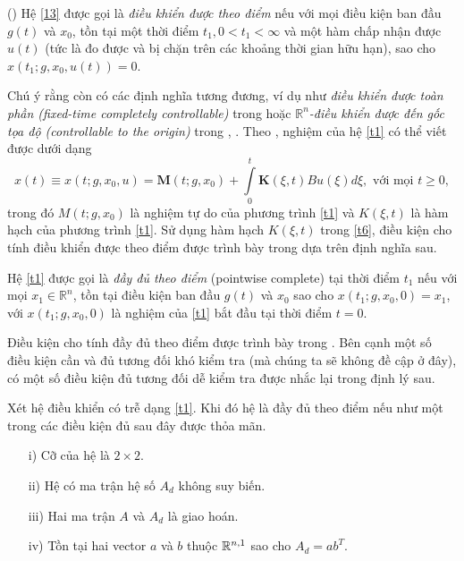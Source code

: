 \begin{dng} 
(\cite{Del72}) Hệ \eqref{13} được gọi là {\it điều khiển được theo điểm} nếu với mọi điều kiện ban đầu $g(t)$ và $x_0$, tồn tại một thời điểm $t_1,0<t_1<\infty$ và một hàm chấp nhận được  $u(t)$ (tức là đo được và bị chặn trên các khoảng thời gian hữu hạn), sao cho $x(t_1;g,x_0,u(t))=0$. 
\end{dng}
%	
Chú ý rằng còn có các định nghĩa tương đương, ví dụ như \textit{điều khiển được toàn phần (fixed-time completely controllable)} trong \cite{Cho72} hoặc {\it $\mathbb{R}^n$-điều khiển được đến gốc tọa độ (controllable to the origin)} trong \cite{Ric03}, \cite{Wei70}. Theo \cite{BelC63}, nghiệm của hệ \eqref{t1} có thể viết được dưới dạng
%
\begin{equation}\label{t6}
x(t)\equiv x(t;g,x_0,u)=\mathbf{M}(t;g,x_0)+\int\limits^t_0\mathbf{K}(\xi,t)B u(\xi)d\xi, \mbox{ với mọi } t\geq 0,
\end{equation} 
%
trong đó $M(t;g,x_0)$ là nghiệm tự do của  phương trình \eqref{t1} và $K(\xi,t)$ là hàm hạch của phương trình \eqref{t1}. Sử dụng hàm hạch $K(\xi,t)$ trong \eqref{t6}, điều kiện cho tính điều khiển được theo điểm được trình bày trong \cite{Wei67} dựa trên định nghĩa sau.

\begin{dng} Hệ \eqref{t1} được gọi là \textit{đầy đủ theo điểm} (pointwise complete) tại thời điểm $t_1$ nếu với mọi $x_1\in \mathbb{R}^n$, tồn tại điều kiện ban đầu $g(t)$ và $x_0$ sao cho $x(t_1;g,x_0,0)=x_1$, với $x(t_1;g,x_0,0)$ là nghiệm của \eqref{t1} bắt đầu tại thời điểm $t=0$.
\end{dng}
%
Điều kiện cho tính đầy đủ theo điểm được trình bày trong \cite{AsnH73,Bro73,Cho72,Mal87,Tho77}. Bên cạnh một số điều kiện cần và đủ tương đối khó kiểm tra (mà chúng ta sẽ không đề cập ở đây), có một số điều kiện đủ tương đối dễ kiểm tra được nhắc lại trong định lý sau.

\begin{dly}\label{pointwise completeness}\cite[Chương 5]{Mal87}
Xét hệ điều khiển có trễ dạng \eqref{t1}. Khi đó hệ là đầy đủ theo điểm nếu như một trong các điều kiện đủ sau đây được thỏa mãn.
\begin{enumerate}
\item[i)] Cỡ của hệ là $2\times 2$. 
\item[ii)] Hệ có ma trận hệ số $A_d$ không suy biến.
\item[iii)] Hai ma trận $A$ và $A_d$ là giao hoán.
\item[iv)] Tồn tại hai vector $a$ và $b$ thuộc $\mathbb{R}^{n,1}$ sao cho 
$A_d = a b^T$.
\end{enumerate}
\end{dly}

